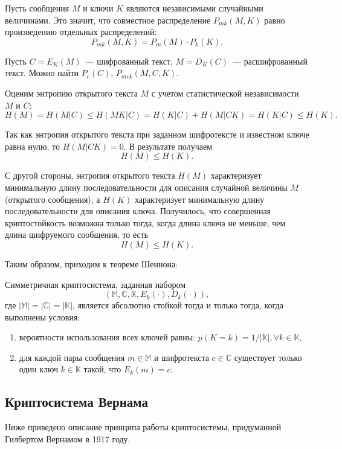 Пусть сообщения $M$ и ключи $K$ являются независимыми случайными величинами. Это значит, что совместное распределение $P_{mk}(M, K)$ равно произведению отдельных распределений:
\begin{equation}
  P_{mk}(M, K) = P_m(M) \cdot P_k(K).
\end{equation}

Пусть $C = E_K(M)$~--- шифрованный текст, $M = D_K(C)$~--- расшифрованный текст. Можно найти $P_c(C)$, $P_{mck}(M, C, K).$

Оценим энтропию открытого текста $M$ с учетом статистической независимости $M$ и $C$:
\begin{equation}
  H(M) = H(M|C) \leq H(MK|C) = H(K|C) + H(M|CK) = H(K|C) \leq H(K).
\end{equation}

Так как энтропия открытого текста при заданном шифротексте и известном ключе равна нулю, то $H(M|CK) = 0$. В результате получаем
\begin{equation}
   H(M) \leq H(K).
\end{equation}

С другой стороны, энтропия открытого текста $H(M)$ характеризует минимальную длину последовательности для описания случайной величины 
$M$ (открытого сообщения), а $H(K)$ характеризует минимальную длину последовательности для описания ключа. Получилось, что совершенная криптостойкость возможна 
только тогда, когда длина ключа не меньше, чем длина шифруемого сообщения, то есть
$$ H(M) \leq H(K). $$

Таким образом, приходим к теореме Шеннона:
\begin{theorem}
  Симметричная криптосистема, заданная набором $$ (\mathbb{M}, \mathbb{C}, \mathbb{K}, E_k(\cdot), D_k(\cdot)), $$
  где $|\mathbb{M}| = |\mathbb{C}| = |\mathbb{K}|$, является абсолютно стойкой тогда и только тогда, когда выполнены условия:
  \begin{enumerate}
    \item вероятности использования всех ключей равны: $p(K = k) = 1 / |\mathbb{K}|, \forall k \in \mathbb{K}$,
    \item для каждой пары сообщения $m \in \mathbb{M}$ и шифротекста $c \in \mathbb{C}$ существует только один ключ $k \in \mathbb{K}$ такой, что $E_k(m) = c$.
  \end{enumerate}
\end{theorem}


\subsection{Криптосистема Вернама}
Ниже приведено описание принципа работы криптосистемы, придуманной Гилбертом Вернамом в 1917 году.

